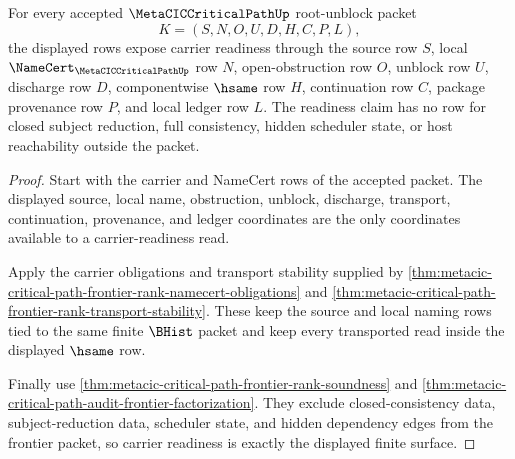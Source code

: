 \begin{theorem}
\label{thm:metacic-critical-path-root-unblock-carrier-readiness}
For every accepted $\MetaCICCriticalPathUp$ root-unblock packet
$$
K=(S,N,O,U,D,H,C,P,L),
$$
the displayed rows expose carrier readiness through the source row $S$, local $\NameCert_{\MetaCICCriticalPathUp}$ row $N$, open-obstruction row $O$, unblock row $U$, discharge row $D$, componentwise $\hsame$ row $H$, continuation row $C$, package provenance row $P$, and local ledger row $L$. The readiness claim has no row for closed subject reduction, full consistency, hidden scheduler state, or host reachability outside the packet.
\end{theorem}
\begin{proof}
Start with the carrier and NameCert rows of the accepted packet. The displayed source, local name, obstruction, unblock, discharge, transport, continuation, provenance, and ledger coordinates are the only coordinates available to a carrier-readiness read.

Apply the carrier obligations and transport stability supplied by \autoref{thm:metacic-critical-path-frontier-rank-namecert-obligations} and \autoref{thm:metacic-critical-path-frontier-rank-transport-stability}. These keep the source and local naming rows tied to the same finite $\BHist$ packet and keep every transported read inside the displayed $\hsame$ row.

Finally use \autoref{thm:metacic-critical-path-frontier-rank-soundness} and \autoref{thm:metacic-critical-path-audit-frontier-factorization}. They exclude closed-consistency data, subject-reduction data, scheduler state, and hidden dependency edges from the frontier packet, so carrier readiness is exactly the displayed finite surface.
\end{proof}


